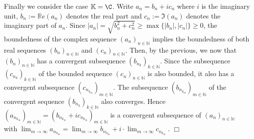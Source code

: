 Finally we consider the case $\mathbb{K}=\C$. Write $a_n=b_n+ic_n$ where $i$ is the imaginary unit, 
$b_n:=\mathbb{R}e(a_n)$ denotes the real part and $c_n:={\Im}(a_n)$ denotes the imaginary part of $a_n$. 
Since $|a_n|=\sqrt{b_n^2+c_n^2}\geq \max\{|b_n|,|c_n|\}\geq 0$, the boundedness of the complex sequence $(a_n)_{n\in\mathbb{N}}$ implies
the boundedness of both real sequences $(b_n)_{n\in\mathbb{N}}$ and $(c_n)_{n\in\mathbb{N}}$. Then, by the previous, we now that 
$(b_n)_{n\in\mathbb{N}}$ has a convergent subsequence $(b_{n_k})_{k\in\mathbb{N}}$. Since the subsequence $(c_{n_k})_{k\in\mathbb{N}}$ of the bounded sequence $(c_n)_{n\in\mathbb{N}}$
is also bounded, it also has a convergent subsequence $(c_{n_{k_m}})_{m\in\mathbb{N}}$. The subsequence $(b_{n_{k_m}})_{m\in\mathbb{N}}$ of the 
convergent sequence $(b_{n_k})_{k\in\mathbb{N}}$ also converges. Hence $(a_{n_{k_m}})_{m\in\mathbb{N}} = (b_{n_{k_m}}+ic_{n_{k_m}})_{m\in\mathbb{N}}$ 
is a convergent subsequence of $(a_n)_{n\in\mathbb{N}}$ with 
$\lim_{m\rightarrow \infty} a_{n_{k_m}} = \lim_{m\rightarrow \infty} b_{n_{k_m}} + i\cdot  \lim_{m\rightarrow \infty} c_{n_{k_m}} \ .$
\hfill$\Box$

